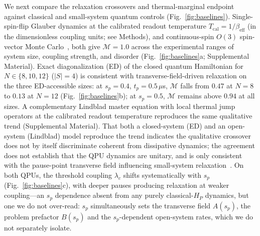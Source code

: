 \documentclass[aps,prapplied,reprint,superscriptaddress,floatfix,nofootinbib]{revtex4-2}
\begin{document}
We next compare the relaxation crossovers and thermal-marginal endpoint against classical and small-system quantum controls (Fig.~\ref{fig:baselines}).
Single-spin-flip Glauber dynamics at the calibrated readout temperature $T_\mathrm{cal}=1/\beta_\mathrm{eff}$ (in the dimensionless coupling units; see Methods), and continuous-spin $O(3)$ spin-vector Monte Carlo~\cite{shin2014svmc}, both give $\mathcal{M}=1.0$ across the experimental ranges of system size, coupling strength, and disorder (Fig.~\ref{fig:baselines}a; Supplemental Material).
Exact diagonalization (ED) of the closed quantum Hamiltonian for $N\in\{8,10,12\}$ ($|S|=4$) is consistent with transverse-field-driven relaxation on the three ED-accessible sizes: at $s_p=0.4$, $t_p=0.5\,\mu$s, $\mathcal{M}$ falls from $0.47$ at $N=8$ to $0.13$ at $N=12$ (Fig.~\ref{fig:baselines}b); at $s_p=0.5$, $\mathcal{M}$ remains above $0.94$ at all sizes.
A complementary Lindblad master equation with local thermal jump operators at the calibrated readout temperature reproduces the same qualitative trend (Supplemental Material).
That both a closed-system (ED) and an open-system (Lindblad) model reproduce the trend indicates the qualitative crossover does not by itself discriminate coherent from dissipative dynamics; the agreement does not establish that the QPU dynamics are unitary, and is only consistent with the pause-point transverse field influencing small-system relaxation~\cite{mehta2025dwave}.
On both QPUs, the threshold coupling $\lambda_c$ shifts systematically with $s_p$ (Fig.~\ref{fig:baselines}c), with deeper pauses producing relaxation at weaker coupling---an $s_p$ dependence absent from any purely classical-$H_P$ dynamics, but one we do not over-read: $s_p$ simultaneously sets the transverse field $A(s_p)$, the problem prefactor $B(s_p)$ and the $s_p$-dependent open-system rates, which we do not separately isolate.
\end{document}

